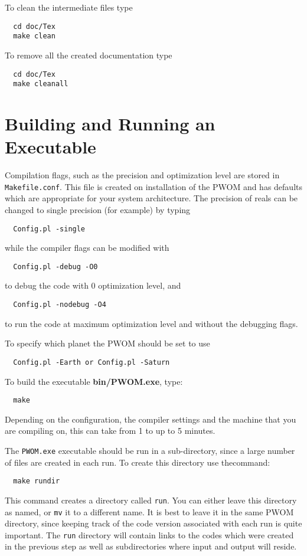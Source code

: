 To clean the intermediate files type
\begin{verbatim}
  cd doc/Tex
  make clean
\end{verbatim}
To remove all the created documentation type
\begin{verbatim}
  cd doc/Tex
  make cleanall
\end{verbatim}

\section{Building and Running an Executable}


Compilation flags, such as the precision and optimization 
level are stored in {\tt Makefile.conf}. This file is created on
installation of the PWOM and has defaults which are appropriate for
your system architecture.  The precision of reals
can be changed to single precision (for example) by typing
\begin{verbatim}
  Config.pl -single
\end{verbatim}
while the compiler flags can be modified with
\begin{verbatim}
  Config.pl -debug -O0
\end{verbatim}
to debug the code with 0 optimization level, and
\begin{verbatim}
  Config.pl -nodebug -O4
\end{verbatim}
to run the code at maximum optimization level and without the debugging flags.

To specify which planet the PWOM should be set to use 
\begin{verbatim}
  Config.pl -Earth or Config.pl -Saturn
\end{verbatim}


To build the executable {\bf bin/PWOM.exe}, type:
\begin{verbatim}
  make
\end{verbatim} 
Depending on the configuration, the compiler settings and the machine 
that you are compiling on, this can take from 1 to up to 5 minutes.  

The {\tt PWOM.exe} executable should be run in a sub-directory, since a 
large number of files are created in each run.  
To create this directory use thecommand:
\begin{verbatim}
  make rundir
\end{verbatim} 
This command creates a directory called {\tt run}.  You can either
leave this directory as named, or {\tt mv} it to a different name.  It
is best to leave it in the same PWOM directory, since
keeping track of the code version associated with each run is quite
important.  The {\tt run} directory will contain links to the codes
which were created in the previous step as well as subdirectories
where input and output will reside.

